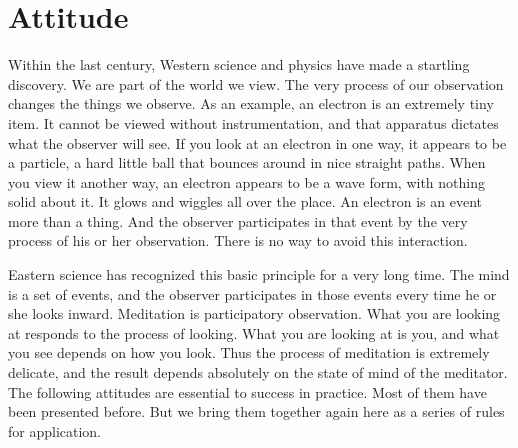\section{Attitude}
Within the last century, Western science and physics have
made a startling discovery. We are part of the world we view. The very process
of our observation changes the things we observe. As an example, an electron is
an extremely tiny item. It cannot be viewed without instrumentation, and that
apparatus dictates what the observer will see. If you look at an electron in one
way, it appears to be a particle, a hard little ball that bounces around in nice
straight paths. When you view it another way, an electron appears to be a wave
form, with nothing solid about it. It glows and wiggles all over the place. An
electron is an event more than a thing. And the observer participates in that
event by the very process of his or her observation. There is no way to avoid
this interaction.

Eastern science has recognized this basic principle for a very long time. The
mind is a set of events, and the observer participates in those events every
time he or she looks inward. Meditation is participatory observation. What you
are looking at responds to the process of looking. What you are looking at is
you, and what you see depends on how you look. Thus the process of meditation is
extremely delicate, and the result depends absolutely on the state of mind of
the meditator. The following attitudes are essential to success in practice.
Most of them have been presented before. But we bring them together again here
as a series of rules for application.

